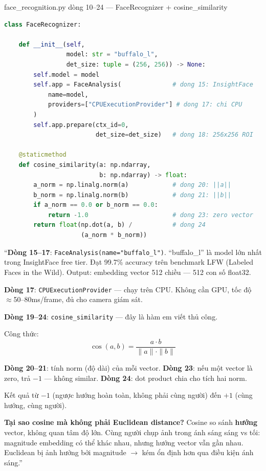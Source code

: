 \documentclass[12pt, a4paper]{article}
\begin{document}
\begin{code}{face\_recognition.py dòng 10--24 --- FaceRecognizer + cosine\_similarity}
\begin{lstlisting}[language=Python, firstnumber=10]
class FaceRecognizer:

    def __init__(self,
                 model: str = "buffalo_l",
                 det_size: tuple = (256, 256)) -> None:
        self.model = model
        self.app = FaceAnalysis(              # dong 15: InsightFace
            name=model,
            providers=["CPUExecutionProvider"] # dong 17: chi CPU
        )
        self.app.prepare(ctx_id=0,
                         det_size=det_size)   # dong 18: 256x256 ROI

    @staticmethod
    def cosine_similarity(a: np.ndarray,
                          b: np.ndarray) -> float:
        a_norm = np.linalg.norm(a)            # dong 20: ||a||
        b_norm = np.linalg.norm(b)            # dong 21: ||b||
        if a_norm == 0.0 or b_norm == 0.0:
            return -1.0                       # dong 23: zero vector
        return float(np.dot(a, b) /           # dong 24
                     (a_norm * b_norm))
\end{lstlisting}
\end{code}

\begin{say}
``\textbf{Dòng 15--17}: \texttt{FaceAnalysis(name="buffalo\_l")}.
``buffalo\_l'' là model lớn nhất trong InsightFace free tier.
Đạt 99.7\% accuracy trên benchmark LFW (Labeled Faces in the Wild).
Output: embedding vector 512 chiều --- 512 con số float32.

\textbf{Dòng 17}: \texttt{CPUExecutionProvider} --- chạy trên CPU.
Không cần GPU, tốc độ $\approx$50--80ms/frame, đủ cho camera giám sát.

\textbf{Dòng 19--24}: \texttt{cosine\_similarity} --- đây là hàm em viết thủ công.

Công thức:
$$\cos(a, b) = \frac{a \cdot b}{\|a\| \cdot \|b\|}$$

\textbf{Dòng 20--21}: tính norm (độ dài) của mỗi vector.
\textbf{Dòng 23}: nếu một vector là zero, trả $-1$ --- không similar.
\textbf{Dòng 24}: dot product chia cho tích hai norm.

Kết quả từ $-1$ (ngược hướng hoàn toàn, không phải cùng người) đến $+1$ (cùng hướng, cùng người).

\textbf{Tại sao cosine mà không phải Euclidean distance?}
Cosine so sánh \textbf{hướng} vector, không quan tâm độ lớn.
Cùng người chụp ảnh trong ánh sáng sáng vs tối: magnitude embedding có thể khác nhau,
nhưng hướng vector vẫn gần nhau.
Euclidean bị ảnh hưởng bởi magnitude $\to$ kém ổn định hơn qua điều kiện ánh sáng.''
\end{say}
\end{document}
